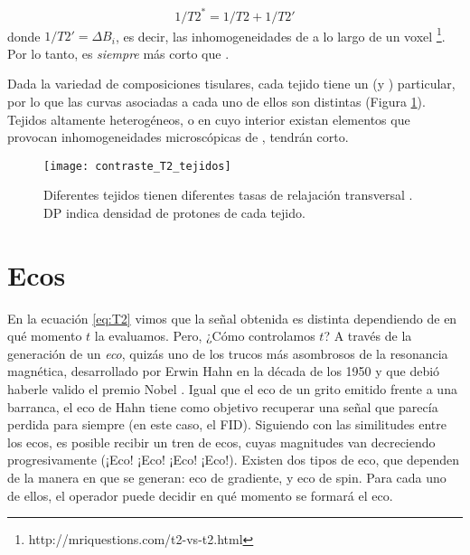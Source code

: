 \begin{equation}
 1/T2^* = 1/T2 + 1/T2'
\end{equation}
donde $1/T2'= \Delta B_i$, es decir, las inhomogeneidades de \Bzero a lo largo de un voxel \footnote{http://mriquestions.com/t2-vs-t2.html}. Por lo tanto, \Ttwostar es \textit{siempre} más corto que \Ttwo.


Dada la variedad de composiciones tisulares, cada tejido tiene un \Ttwo (y \Ttwostar) particular, por lo que las curvas asociadas a cada uno de ellos son distintas (Figura \ref{fig:contraste_T2_tejidos}). Tejidos altamente heterogéneos, o en cuyo interior existan elementos que provocan inhomogeneidades microscópicas de \Bzero, tendrán \Ttwo corto.

\begin{figure}[htb]
\begin{figg}
   \texttt{[image: contraste\_T2\_tejidos]}
   \caption{Diferentes tejidos tienen diferentes tasas de relajación transversal \Ttwo. DP indica densidad de protones de cada tejido.}
 \label{fig:contraste_T2_tejidos}
 \end{figg}
\end{figure}



\section{Ecos}
En la ecuación \ref{eq:T2} vimos que la señal obtenida es distinta dependiendo de en qué momento $t$ la evaluamos. Pero, ¿Cómo controlamos $t$? A través de la generación de un \textit{eco}, quizás uno de los trucos más asombrosos de la resonancia magnética, desarrollado por Erwin Hahn en la década de los 1950 y que debió haberle valido el premio Nobel \citep{mansfield2013long}. Igual que el eco de un grito emitido frente a una barranca, el eco de Hahn tiene como objetivo recuperar una señal que parecía perdida para siempre (en este caso, el FID). Siguiendo con las similitudes entre los ecos, es posible recibir un tren de ecos, cuyas magnitudes van decreciendo progresivamente ({\Large ¡Eco!} {\normalsize ¡Eco!} {\small ¡Eco!} {\tiny ¡Eco!}). Existen dos tipos de eco, que dependen de la manera en que se generan: eco de gradiente, y eco de spin. Para cada uno de ellos, el operador puede decidir en qué momento se formará el eco.


